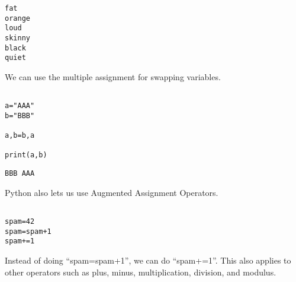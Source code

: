 \documentclass[11pt]{article}
\begin{document}
\begin{verbatim}
fat
orange
loud
skinny
black
quiet
\end{verbatim}


We can use the multiple assignment for swapping variables.

\begin{verbatim}

a="AAA"
b="BBB"

a,b=b,a

print(a,b)

\end{verbatim}

\begin{verbatim}
BBB AAA
\end{verbatim}


Python also lets us use Augmented Assignment Operators.

\begin{verbatim}

spam=42
spam=spam+1
spam+=1

\end{verbatim}

Instead of doing ``spam=spam+1'', we can do ``spam+=1''. This also applies to other operators such as plus, minus, multiplication, division, and modulus.
\end{document}
